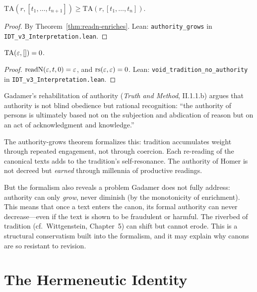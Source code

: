 \begin{theorem}
\label{thm:authority-grows}
$\mathrm{TA}(r, [t_1, \ldots, t_{n+1}]) \geq \mathrm{TA}(r, [t_1, \ldots, t_n])$.
\end{theorem}

\begin{proof}
By Theorem~\ref{thm:readn-enriches}.
Lean: \texttt{authority\_grows} in \texttt{IDT\_v3\_Interpretation.lean}.
\end{proof}

\begin{theorem}
\label{thm:void-tradition}
$\mathrm{TA}(\varepsilon, []) = 0$.
\end{theorem}

\begin{proof}
$\mathrm{readN}(\varepsilon, t, 0) = \varepsilon$, and $\mathrm{rs}(\varepsilon, \varepsilon) = 0$.
Lean: \texttt{void\_tradition\_no\_authority} in
\texttt{IDT\_v3\_Interpretation.lean}.
\end{proof}

\begin{interpretation}
Gadamer's rehabilitation of authority (\textit{Truth and Method}, II.1.1.b)
argues that authority is not blind obedience but rational recognition:
``the authority of persons is ultimately based not on the subjection and
abdication of reason but on an act of acknowledgment and knowledge.''

The authority-grows theorem formalizes this: tradition accumulates weight
through repeated engagement, not through coercion. Each re-reading of the
canonical texts adds to the tradition's self-resonance. The authority of
Homer is not decreed but \emph{earned} through millennia of productive
readings.

But the formalism also reveals a problem Gadamer does not fully address:
authority can only \emph{grow}, never diminish (by the monotonicity of
enrichment). This means that once a text enters the canon, its formal
authority can never decrease---even if the text is shown to be fraudulent
or harmful. The riverbed of tradition (cf.~Wittgenstein, Chapter~5) can
shift but cannot erode. This is a structural conservatism built into the
formalism, and it may explain why canons are so resistant to revision.
\end{interpretation}

\section{The Hermeneutic Identity}

